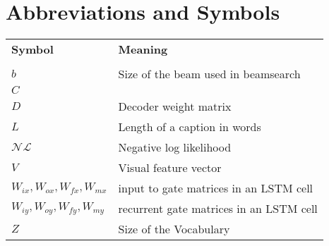 \chapter*{Abbreviations and Symbols}


\noindent
\begin{longtable}{@{}p{}p{}@{}}
        \bf Symbol & \bf Meaning\\\\
        $b$   & Size of the beam used in beamsearch\\
        $C$   & \\
        $D$ & Decoder weight matrix\\
        $L$   & Length of a caption in words\\
        $\mathcal{NL}$ & Negative log likelihood \\
        $V$   & Visual feature vector\\
        $W_{ix},W_{ox},W_{fx}, W_{mx}$ & input to gate matrices in an LSTM cell \\
        $W_{iy},W_{oy},W_{fy}, W_{my}$ & recurrent gate matrices in an LSTM cell \\
        $Z$   & Size of the Vocabulary\\

\end{longtable}
